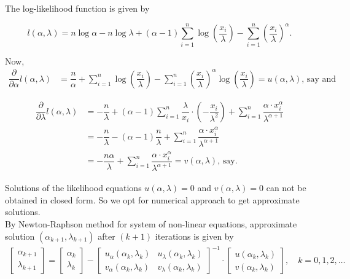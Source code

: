 \documentclass[11pt, a4paper]{article}\usepackage[]{graphicx}\usepackage[]{xcolor}
\begin{document}
\vspace{0.5cm}

The log-likelihood function is given by

$$l(\alpha, \lambda) = n \log \alpha - n \log \lambda + (\alpha - 1) \sum_{i=1}^{n} \log \left( \frac{x_i}{\lambda} \right) - \sum_{i=1}^{n} \left( \frac{x_i}{\lambda} \right)^{\alpha}.$$

Now, 
\begin{align*}
\dfrac{\partial}{\partial \alpha} l(\alpha, \lambda) &= \dfrac{n}{\alpha} + \sum \limits_{i=1}^{n} \log \left( \dfrac{x_i}{\lambda} \right) - \sum \limits_{i=1}^{n} \left( \dfrac{x_i}{\lambda} \right)^{\alpha} \log \left( \dfrac{x_i}{\lambda} \right) = u(\alpha, \lambda) \text{, say and}
\end{align*}

\newpage

\begin{align*}
\dfrac{\partial}{\partial \lambda} l(\alpha, \lambda) &= -\dfrac{n}{\lambda} + (\alpha - 1) \sum \limits_{i=1}^{n} \dfrac{\lambda}{x_i} \cdot \left( -\dfrac{x_i}{\lambda^2} \right) + \sum \limits_{i=1}^{n} \dfrac{\alpha \cdot x_i^{\alpha}}{\lambda^{\alpha + 1}}\\[0.3cm]
&= -\dfrac{n}{\lambda} - (\alpha - 1) \dfrac{n}{\lambda} + \sum \limits_{i=1}^{n} \dfrac{\alpha \cdot x_i^{\alpha}}{\lambda^{\alpha + 1}}\\[0.3cm]
&= -\dfrac{n \alpha}{\lambda} + \sum \limits_{i=1}^{n} \dfrac{\alpha \cdot x_i^{\alpha}}{\lambda^{\alpha + 1}} = v(\alpha, \lambda) \text{, say}.
\end{align*}

Solutions of the likelihood equations $u(\alpha, \lambda) = 0$ and $v(\alpha, \lambda) = 0$ can not be obtained in closed form. So we opt for numerical approach to get approximate solutions. \\

By Newton-Raphson method for system of non-linear equations, approximate solution $(\alpha_{k+1}, \lambda_{k+1})$ after $(k+1)$ iterations is given by
\begin{gather*}
  \begin{bmatrix} \alpha_{k+1} \\ \lambda_{k+1} \end{bmatrix} 
  =
  \begin{bmatrix} \alpha_{k} \\ \lambda_{k} \end{bmatrix}
  -
  \begin{bmatrix} u_{\alpha}(\alpha_k, \lambda_k) & u_{\lambda}(\alpha_k, \lambda_k) \\ v_{\alpha}(\alpha_k, \lambda_k) & v_{\lambda}(\alpha_k, \lambda_k)  \end{bmatrix} ^{-1}
  \cdot
  \begin{bmatrix} u(\alpha_k, \lambda_k) \\ v(\alpha_k, \lambda_k) \end{bmatrix}, \,\,\,\,\,\, k = 0, 1, 2, \ldots
\end{gather*}
\end{document}
